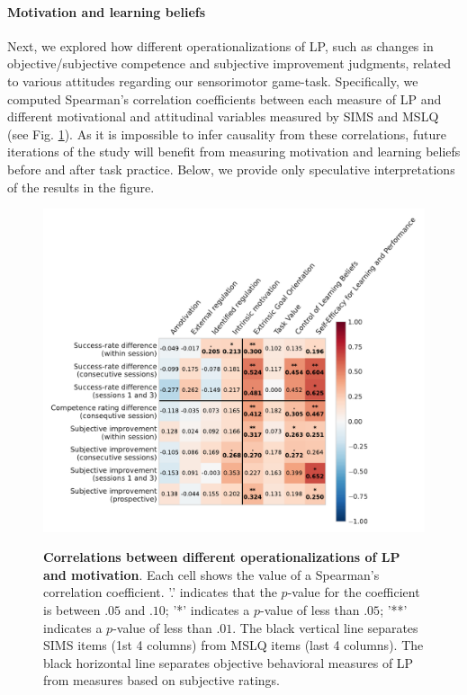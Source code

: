 \paragraph{Motivation and learning beliefs}
Next, we explored how different operationalizations of \ac{LP}, such as changes in objective/subjective competence and subjective improvement judgments, related to various attitudes regarding our sensorimotor game-task. Specifically, we computed Spearman's correlation coefficients between each measure of \ac{LP} and different motivational and attitudinal variables measured by \ac{SIMS} and \ac{MSLQ} (see Fig. \ref{fig:5-motivation_corrs_tight}). As it is impossible to infer causality from these correlations, future iterations of the study will benefit from measuring motivation and learning beliefs before and after task practice. Below, we provide only speculative interpretations of the results in the figure.

\begin{figure}[tbh]
    \centering
    {\includegraphics[width=.9\linewidth]{Figures/c5/motivation_corrs_tight.pdf}}
    \caption[short figure description]{\textbf{Correlations between different operationalizations of
    \ac{LP} and motivation}. Each cell shows the value of a Spearman's correlation coefficient. '.' indicates that the $p$-value for the coefficient is between $.05$ and $.10$; '*' indicates a $p$-value of less than $.05$; '**' indicates a $p$-value of less than $.01$. The black vertical line separates \ac{SIMS} items (1st 4 columns) from \ac{MSLQ} items (last 4 columns). The black horizontal line separates objective behavioral measures of \ac{LP} from measures based on subjective ratings.}\label{fig:5-motivation_corrs_tight}
\end{figure}


